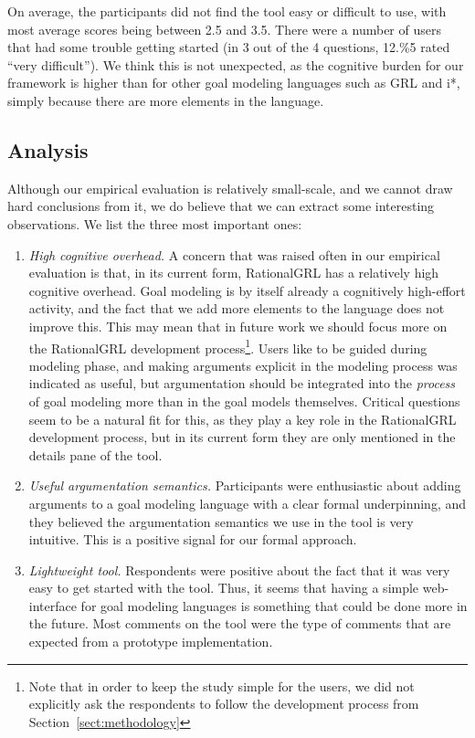 On average, the participants did not find the tool easy or difficult to use, with most average scores being between 2.5 and 3.5. There were a number of users that had some trouble getting started (in 3 out of the 4 questions, 12.\%5 rated ``very difficult''). We think this is not unexpected, as the cognitive burden for our framework is higher than for other goal modeling languages such as GRL and i*, simply because there are more elements in the language. 




\subsection{Analysis}\label{sec:eval-an}
Although our empirical evaluation is relatively small-scale, and we cannot draw hard conclusions from it, we do believe that we can extract some interesting observations. We list the three most important ones:
\begin{enumerate}
\item \emph{High cognitive overhead.} A concern that was raised often in our empirical evaluation is that, in its current form, RationalGRL has a relatively high cognitive overhead. Goal modeling is by itself already a cognitively high-effort activity, and the fact that we add more elements to the language does not improve this. This may mean that in future work we should focus more on the RationalGRL development process\footnote{Note that in order to keep the study simple for the users, we did not explicitly ask the respondents to follow the development process from Section~\ref{sect:methodology}}. Users like to be guided during modeling phase, and making arguments explicit in the modeling process was indicated as useful, but argumentation should be integrated into the \emph{process} of goal modeling more than in the goal models themselves. Critical questions seem to be a natural fit for this, as they play a key role in the RationalGRL development process, but in its current form they are only mentioned in the details pane of the tool.
\item \emph{Useful argumentation semantics.} Participants were enthusiastic about adding arguments to a goal modeling language with a clear formal underpinning, and they believed the argumentation semantics we use in the tool is very intuitive. This is a positive signal for our formal approach.
\item \emph{Lightweight tool.} Respondents were positive about the fact that it was very easy to get started with the tool. Thus, it seems that having a simple web-interface for goal modeling languages is something that could be done more in the future. Most comments on the tool were the type of comments that are expected from a prototype implementation.
\end{enumerate}